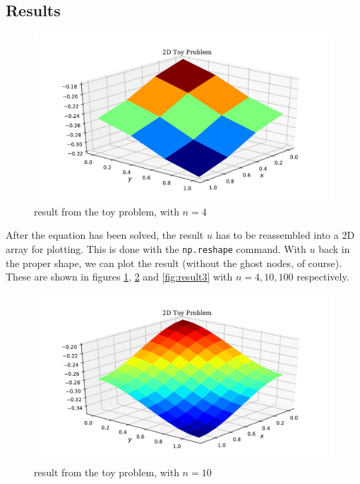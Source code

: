 \documentclass[sigconf]{acmart}
\begin{document}
\subsection{Results}
\begin{figure}
	\centering
	\includegraphics[width=\linewidth]{result1.pdf}
	\caption{result from the toy problem, with $ n=4 $}
	\label{fig:result1}
\end{figure}
After the equation has been solved, the result $ u $ has to be reassembled into a 2D array for plotting. This is done with the \texttt{np.reshape} command. With $ u $ back in the proper shape, we can plot the result (without the ghost nodes, of course). These are shown in figures \ref{fig:result1}, \ref{fig:result2} and \ref{fig:result3} with $ n=4,10,100 $ respectively.

\begin{figure}
	\centering
	\includegraphics[width=\linewidth]{result2.pdf}
	\caption{result from the toy problem, with $ n=10 $}
	\label{fig:result2}
\end{figure}
\end{document}
